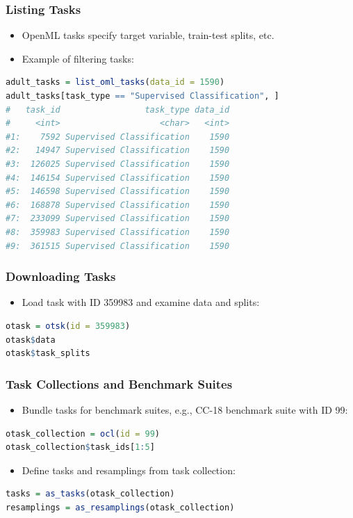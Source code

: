 \documentclass[11pt,compress,t,notes=noshow, aspectratio=169, xcolor=table]{beamer}
\begin{document}
\begin{frame}[fragile]
\frametitle{Listing Tasks}
\begin{itemize}
  \item OpenML tasks specify target variable, train-test splits, etc.
  \item Example of filtering tasks:
\end{itemize}
\begin{lstlisting}[language=R]
adult_tasks = list_oml_tasks(data_id = 1590)
adult_tasks[task_type == "Supervised Classification", ]
#   task_id                 task_type data_id
#     <int>                    <char>   <int>
#1:    7592 Supervised Classification    1590
#2:   14947 Supervised Classification    1590
#3:  126025 Supervised Classification    1590
#4:  146154 Supervised Classification    1590
#5:  146598 Supervised Classification    1590
#6:  168878 Supervised Classification    1590
#7:  233099 Supervised Classification    1590
#8:  359983 Supervised Classification    1590
#9:  361515 Supervised Classification    1590
\end{lstlisting}
\end{frame}

\begin{frame}[fragile]
\frametitle{Downloading Tasks}
\begin{itemize}
  \item Load task with ID 359983 and examine data and splits:
\end{itemize}
\begin{lstlisting}[language=R]
otask = otsk(id = 359983)
otask$data
otask$task_splits
\end{lstlisting}
\end{frame}

\begin{frame}[fragile]
\frametitle{Task Collections and Benchmark Suites}
\begin{itemize}
  \item Bundle tasks for benchmark suites, e.g., CC-18 benchmark suite with ID 99:
\end{itemize}
\begin{lstlisting}[language=R]
otask_collection = ocl(id = 99)
otask_collection$task_ids[1:5]
\end{lstlisting}
\begin{itemize}
  \item Define tasks and resamplings from task collection:
\end{itemize}
\begin{lstlisting}[language=R]
tasks = as_tasks(otask_collection)
resamplings = as_resamplings(otask_collection)
\end{lstlisting}
\end{frame}
\end{document}
